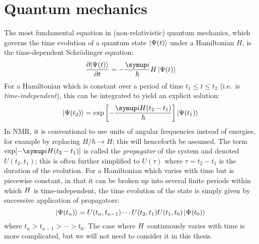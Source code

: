 \section{Quantum mechanics}
\label{sec:theory__quantum_mechanics}

The most fundamental equation in (non-relativistic) quantum mechanics, which governs the time evolution of a quantum state $\ket{\Psi(t)}$ under a Hamiltonian $H$, is the time-dependent Schr\"{o}dinger equation:
\begin{equation}
    \label{eq:tdse}
    \frac{\partial\!\ket{\Psi(t)}}{\partial t} = -\frac{\mi}{\hbar}H\ket{\Psi(t)} 
\end{equation}
For a Hamiltonian which is constant over a period of time $t_1 \leq t \leq t_2$ (i.e.\ is \textit{time-independent}), this can be integrated to yield an explicit solution:
\begin{equation}
    \label{eq:time_evolution}
    \ket{\Psi(t_2)} = \exp\left[-\frac{\mi H (t_2 - t_1)}{\hbar}\right]\ket{\Psi(t_1)}
\end{equation}
In NMR, it is conventional to use units of angular frequencies instead of energies, for example by replacing $H/\hbar \to H$; this will henceforth be assumed.
The term $\exp[-\mi H(t_2 - t_1)]$ is called the \textit{propagator} of the system and denoted $U(t_2, t_1)$; this is often further simplified to $U(\tau)$ where $\tau = t_2 - t_1$ is the duration of the evolution.
For a Hamiltonian which varies with time but is piecewise constant, in that it can be broken up into several finite periods within which $H\/$ is time-independent, the time evolution of the state is simply given by successive application of propagators:
\begin{equation}
    \label{eq:time_evolution_piecewise}
    \ket{\Psi(t_n)} = U(t_n,t_{n-1})\cdots U(t_2,t_1)U(t_1,t_0) \ket{\Psi(t_0)}
\end{equation}
where $t_n > t_{n-1} > \cdots > t_0$.
The case where $H\/$ continuously varies with time is more complicated, but we will not need to consider it in this thesis.


